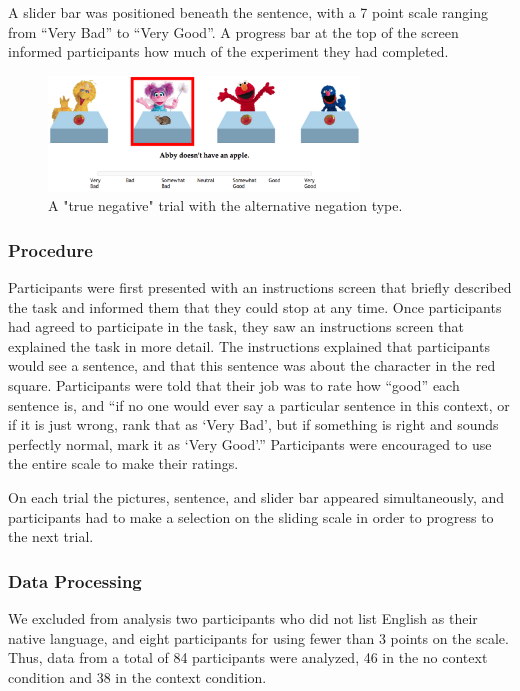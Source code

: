 \documentclass[10pt,letterpaper]{article}
\begin{document}
A slider bar was positioned beneath the sentence, with a 7 point scale ranging from ``Very Bad'' to ``Very Good''.  A progress bar at the top of the screen informed participants how much of the experiment they had completed. 

\begin{figure}[t]
\begin{center} 
\includegraphics[width=3.25in]{figures/example.png}
\caption{\label{fig:trial} A "true negative" trial with the alternative negation type.}
\vspace{-5mm}
\end{center} 
\end{figure}

\subsubsection{Procedure}
Participants were first presented with an instructions screen that briefly described the task and informed them that they could stop at any time.  Once participants had agreed to participate in the task, they saw an instructions screen that explained the task in more detail.  The instructions explained that participants would see a sentence, and that this sentence was about the character in the red square.  Participants were told that their job was to rate how ``good'' each sentence is, and ``if no one would ever say a particular sentence in this context, or if it is just wrong, rank that as `Very Bad', but if something is right and sounds perfectly normal, mark it as `Very Good'.''  Participants were encouraged to use the entire scale to make their ratings.

On each trial the pictures, sentence, and slider bar appeared simultaneously, and participants had to make a selection on the sliding scale in order to progress to the next trial.  

\subsubsection{Data Processing}
We excluded from analysis two participants who did not list English as their native language, and eight participants for using fewer than 3 points on the scale.  Thus, data from a total of 84 participants were analyzed, 46 in the no context condition and 38 in the context condition.  
\end{document}

